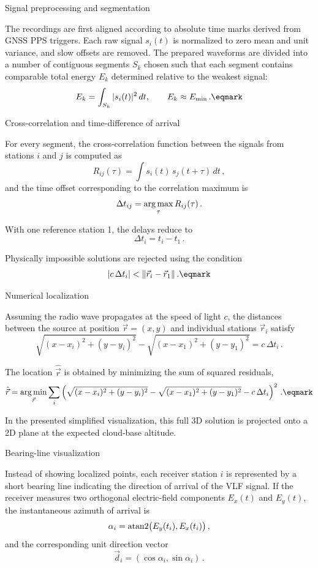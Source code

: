 \secc Signal preprocessing and segmentation

The recordings are first aligned according to absolute time marks derived from GNSS PPS triggers. 
Each raw signal $s_i(t)$ is normalized to zero mean and unit variance, and slow offsets are removed.
The prepared waveforms are divided into a number of contiguous segments $S_k$
chosen such that each segment contains comparable total energy $E_k$
determined relative to the weakest signal:
$$
E_k = \int_{S_k} |s_i(t)|^2 \, dt , \qquad
E_k \approx E_{\rm min} \,.
\eqmark
$$

\seccc Cross-correlation and time-difference of arrival

For every segment, the cross-correlation function between the signals from
stations $i$ and $j$ is computed as
$$
R_{ij}(\tau) = \int s_i(t)\,s_j(t+\tau)\,dt \,,
$$
and the time offset corresponding to the correlation maximum is
$$
\Delta t_{ij} = \mathop{\rm arg\,max}_{\tau} R_{ij}(\tau) \,.
$$

With one reference station 1, the delays reduce to
$$
\Delta t_i = t_i - t_1 \,.
$$

Physically impossible solutions are rejected using the condition
$$
|c \,\Delta t_i| < \Vert \vec r_i - \vec r_1 \Vert \,.
\eqmark
$$

\seccc Numerical localization

Assuming the radio wave propagates at the speed of light $c$, 
the distances between the source at position $\vec r=(x,y)$
and individual stations $\vec r_i$ satisfy
$$
\sqrt{(x - x_i)^2 + (y - y_i)^2} -
\sqrt{(x - x_1)^2 + (y - y_1)^2} = c\,\Delta t_i \,.
$$

The location $\hat{\vec r}$ is obtained by minimizing the sum of squared residuals,
$$
\hat{\vec r} = 
\mathop{\rm arg\,min}_{\vec r} \sum_i
\left(
\sqrt{(x - x_i)^2 + (y - y_i)^2} -
\sqrt{(x - x_1)^2 + (y - y_1)^2} -
c\,\Delta t_i
\right)^2 \,.
\eqmark
$$

In the presented simplified visualization, this full 3D solution
is projected onto a 2D plane at the expected cloud-base altitude.

\seccc Bearing-line visualization

Instead of showing localized points, each receiver station $i$ is represented
by a short bearing line indicating the direction of arrival of the VLF
signal.  
If the receiver measures two orthogonal electric-field components $E_x(t)$ and
$E_y(t)$, the instantaneous azimuth of arrival is
$$
\alpha_i = \mathop{\rm atan2}\bigl(E_y(t_i), E_x(t_i)\bigr) \,,
$$
and the corresponding unit direction vector
$$
\vec d_i = (\cos\alpha_i, \sin\alpha_i) \,.
$$

